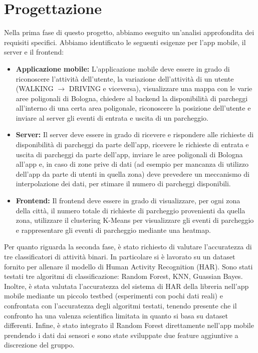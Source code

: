 \documentclass[../../Report.tex]{subfiles}
\begin{document}
    \chapter{Progettazione}
    Nella prima fase di questo progetto, abbiamo eseguito un'analisi approfondita dei requisiti specifici. Abbiamo identificato le seguenti esigenze per l'app mobile, il server e il frontend:
    \begin{itemize}
        \item \textbf{Applicazione mobile:} L'applicazione mobile deve essere in grado di riconoscere l'attività dell'utente, la variazione dell'attività di un utente (WALKING $\rightarrow$ DRIVING e viceversa), visualizzare una mappa con le varie aree poligonali di Bologna, chiedere al backend la disponibilità di parcheggi all'interno di una certa area poligonale, riconoscere la posizione dell'utente e inviare al server gli eventi di entrata e uscita di un parcheggio.
        \item \textbf{Server:} Il server deve essere in grado di ricevere e rispondere alle richieste di disponibilità di parcheggi da parte dell'app, ricevere le richieste di entrata e uscita di parcheggi da parte dell'app, inviare le aree poligonali di Bologna all'app e, in caso di zone prive di dati (ad esempio per mancanza di utilizzo dell'app da parte di utenti in quella zona) deve prevedere un meccanismo di interpolazione dei dati, per stimare il numero di parcheggi disponibili.
        \item \textbf{Frontend:} Il frontend deve essere in grado di visualizzare, per ogni zona della città, il numero totale di richieste di parcheggio provenienti da quella zona, utilizzare il clustering K-Means per visualizzare gli eventi di parcheggio e rappresentare gli eventi di parcheggio mediante una heatmap.
    \end{itemize}

    Per quanto riguarda la seconda fase, è stato richiesto di valutare l'accuratezza di tre classificatori di attività binari. In particolare si è lavorato su un dataset fornito per allenare il modello di Human Activity Recognition (HAR). Sono stati testati tre algoritmi di classificazione: Random Forest, KNN, Guassian Bayes. Inoltre, è stata valutata l'accuratezza del sistema di HAR della libreria nell'app mobile mediante un piccolo testbed (esperimenti con pochi dati reali) e confrontata con l'accuratezza degli algoritmi testati, tenendo presente che il confronto ha una valenza scientifica limitata in quanto si basa su dataset differenti. Infine, è stato integrato il Random Forest direttamente nell'app mobile prendendo i dati dai sensori e sono state sviluppate due feature aggiuntive a discrezione del gruppo.
    
\end{document}
